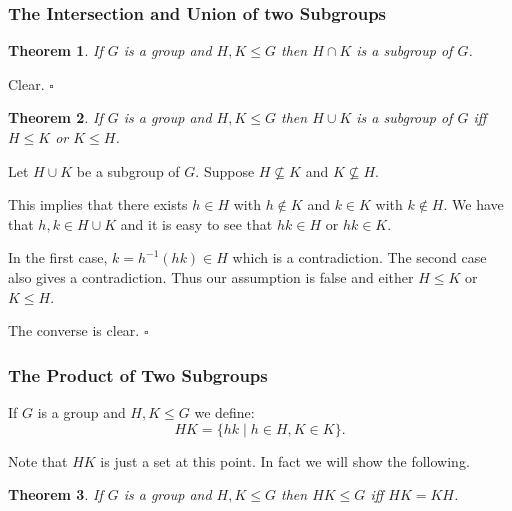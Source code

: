 \documentclass[10pt]{article}
\newtheorem{theorem}{Theorem}[section]
\newenvironment{proof}[1][Proof]{\begin{trivlist}
\item[\hskip \labelsep {\itshape #1}]}{\end{trivlist}}
\newenvironment{definition}[1][Definition]{\begin{trivlist}
\item[\hskip \labelsep {\bfseries #1}]}{\end{trivlist}}
\begin{document}
\subsubsection{The Intersection and Union of two Subgroups}

\begin{theorem}
If $G$ is a group and $H, K \leq G$ then $H\cap K$ is a subgroup of $G$.
\end{theorem}

\begin{proof}
Clear. $\square$
\end{proof}

\begin{theorem}
If $G$ is a group and $H, K \leq G$ then $H\cup K$ is a subgroup of $G$ iff $H \leq K$ or $K \leq H$.
\end{theorem}

\begin{proof}
Let $H \cup K$ be a subgroup of $G$. Suppose $H \not\subseteq K$ and $K \not\subseteq H$.

This implies that there exists $h \in H$ with $h \notin K$ and $k \in K$ with $k \notin H$. We have that $h, k \in H\cup K$ and it is easy to see that $hk \in H$ or $hk \in K$.

In the first case, $k = h^{-1}(hk) \in H$ which is a contradiction. The second case also gives a contradiction. Thus our assumption is false and either $H \leq K$ or $K \leq H$.

The converse is clear. $\square$
\end{proof}

\subsubsection{The Product of Two Subgroups}

\begin{definition}
If $G$ is a group and $H, K \leq G$ we define:
$$HK = \{hk \;|\; h \in H, K \in K\}.$$
\end{definition}

Note that $HK$ is just a set at this point. In fact we will show the following.

\begin{theorem}\label{HKKH}
If $G$ is a group and $H, K \leq G$ then $HK \leq G$ iff $HK = KH$.
\end{theorem}
\end{document}
